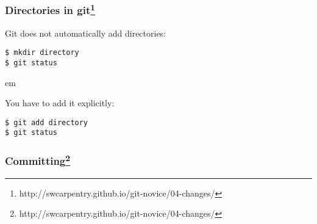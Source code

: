 \documentclass[aspectratio=1610]{beamer}
\begin{document}
\begin{frame}[fragile]
  \frametitle{Directories in git\footnote{http://swcarpentry.github.io/git-novice/04-changes/}}

Git does not automatically add directories:
\begin{verbatim}
$ mkdir directory
$ git status
\end{verbatim}
\pause
{} em

You have to add it explicitly:
\begin{verbatim}
$ git add directory
$ git status
\end{verbatim}

\end{frame}

\begin{frame}
  \frametitle{Committing\footnote{http://swcarpentry.github.io/git-novice/04-changes/}}


\end{frame}
\end{document}
